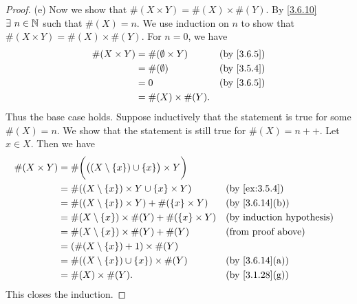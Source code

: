 \begin{proof}{(e)}
  Now we show that \(\#(X \times Y) = \#(X) \times \#(Y)\).
  By \cref{3.6.10} \(\exists\ n \in \N\) such that \(\#(X) = n\).
  We use induction on \(n\) to show that \(\#(X \times Y) = \#(X) \times \#(Y)\).
  For \(n = 0\), we have
  \begin{align*}
    \#(X \times Y) & = \#(\emptyset \times Y) &  & \text{(by \cref{3.6.5})} \\
                   & = \#(\emptyset)          &  & \text{(by \cref{3.5.4})} \\
                   & = 0                      &  & \text{(by \cref{3.6.5})} \\
                   & = \#(X) \times \#(Y).
  \end{align*}
  Thus the base case holds.
  Suppose inductively that the statement is true for some \(\#(X) = n\).
  We show that the statement is still true for \(\#(X) = n++\).
  Let \(x \in X\).
  Then we have
  \begin{align*}
    \#(X \times Y) & = \#\bigg(\big((X \setminus \{x\}) \cup \{x\}\big) \times Y\bigg)                                       \\
                   & = \#((X \setminus \{x\}) \times Y \cup \{x\} \times Y)            &  & \text{(by \cref{ex:3.5.4})}      \\
                   & = \#((X \setminus \{x\}) \times Y) + \#(\{x\} \times Y)           &  & \text{(by \cref{3.6.14}(b))}     \\
                   & = \#(X \setminus \{x\}) \times \#(Y) + \#(\{x\} \times Y)         &  & \text{(by induction hypothesis)} \\
                   & = \#(X \setminus \{x\}) \times \#(Y) + \#(Y)                      &  & \text{(from proof above)}        \\
                   & = (\#(X \setminus \{x\}) + 1) \times \#(Y)                                                              \\
                   & = \#((X \setminus \{x\}) \cup \{x\}) \times \#(Y)                 &  & \text{(by \cref{3.6.14}(a))}     \\
                   & = \#(X) \times \#(Y).                                             &  & \text{(by \cref{3.1.28}(g))}
  \end{align*}
  This closes the induction.
\end{proof}

